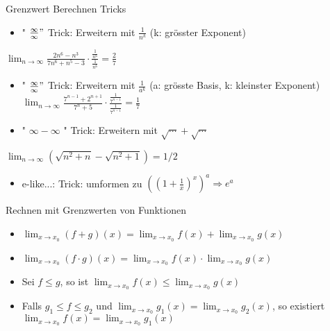 \columnbreak



\begin{KR}{Grenzwert Berechnen Tricks}
    \begin{itemize}
      \item " $\frac{\infty}{\infty} "$ Trick: Erweitern mit $\frac{1}{n^{k}}$ (k: grösster Exponent)
    \end{itemize}
    
    $\lim _{n \rightarrow \infty} \frac{2 n^{6}-n^{3}}{7 n^{6}+n^{5}-3} \cdot \frac{\frac{1}{n^{6}}}{\frac{1}{n^{6}}}=\frac{2}{7}$
    
    \begin{itemize}
      \item " $\frac{\infty}{\infty} "$ Trick: Erweitern mit $\frac{1}{a^{k}}$ (a: grösste Basis, k: kleinster Exponent) $\lim _{n \rightarrow \infty} \frac{7^{n-1}+2^{n+1}}{7^{n}+5} \cdot \frac{\frac{1}{7^{n-1}}}{\frac{1}{7^{n-1}}}=\frac{1}{7}$
      \item " $\infty-\infty$ " Trick: Erweitern mit $\sqrt{\cdots}+\sqrt{\cdots}$
    \end{itemize}
    
    $\lim _{n \rightarrow \infty}\left(\sqrt{n^{2}+n}-\sqrt{n^{2}+1}\right)=1 / 2$
    
    \begin{itemize}
      \item e-like...: Trick: umformen zu $\left(\left(1+\frac{1}{x}\right)^{x}\right)^{a} \Rightarrow e^{a}$
    \end{itemize}
    \end{KR}

    \begin{concept}{Rechnen mit Grenzwerten von Funktionen}
        \begin{itemize}
            \item $\lim_{x \to x_0} (f + g)(x) = \lim_{x \to x_0} f(x) + \lim_{x \to x_0} g(x)$
            \item $\lim_{x \to x_0} (f \cdot g)(x) = \lim_{x \to x_0} f(x) \cdot \lim_{x \to x_0} g(x)$
            \item Sei $f \leq g$, so ist $\lim_{x \to x_0} f(x) \leq \lim_{x \to x_0} g(x)$
            \item Falls $g_1 \leq f \leq g_2$ und $\lim_{x \to x_0} g_1(x) = \lim_{x \to x_0} g_2(x)$, so existiert $\lim_{x \to x_0} f(x) = \lim_{x \to x_0} g_1(x)$
        \end{itemize}
    \end{concept}


